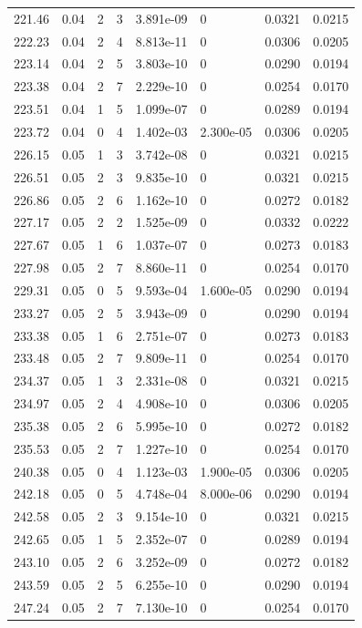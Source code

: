 \documentclass[preview]{standalone}
\begin{document}
{{{{{{\begin{tabular}{L{1.2cm}C{1.2cm} C{0.3cm}C{0.5cm} C{1.4cm}C{1.4cm} C{1.4cm}C{1.4cm}}
  221.46  &  0.04  & 2     &  3 &  3.891e-09  & 0  & 0.0321 &  0.0215   \\ 
  222.23  &  0.04  & 2     &  4 &  8.813e-11  & 0  & 0.0306 &  0.0205   \\ 
  223.14  &  0.04  & 2     &  5 &  3.803e-10  & 0  & 0.0290 &  0.0194   \\ 
  223.38  &  0.04  & 2     &  7 &  2.229e-10  & 0  & 0.0254 &  0.0170   \\ 
  223.51  &  0.04  & 1     &  5 &  1.099e-07  & 0  & 0.0289 &  0.0194   \\ 
  223.72  &  0.04  & 0     &  4 &  1.402e-03  & 2.300e-05  & 0.0306 &  0.0205   \\ 
  226.15  &  0.05  & 1     &  3 &  3.742e-08  & 0  & 0.0321 &  0.0215   \\ 
  226.51  &  0.05  & 2     &  3 &  9.835e-10  & 0  & 0.0321 &  0.0215   \\ 
  226.86  &  0.05  & 2     &  6 &  1.162e-10  & 0  & 0.0272 &  0.0182   \\ 
  227.17  &  0.05  & 2     &  2 &  1.525e-09  & 0  & 0.0332 &  0.0222   \\ 
  227.67  &  0.05  & 1     &  6 &  1.037e-07  & 0  & 0.0273 &  0.0183   \\ 
  227.98  &  0.05  & 2     &  7 &  8.860e-11  & 0  & 0.0254 &  0.0170   \\ 
  229.31  &  0.05  & 0     &  5 &  9.593e-04  & 1.600e-05  & 0.0290 &  0.0194   \\ 
  233.27  &  0.05  & 2     &  5 &  3.943e-09  & 0  & 0.0290 &  0.0194   \\ 
  233.38  &  0.05  & 1     &  6 &  2.751e-07  & 0  & 0.0273 &  0.0183   \\ 
  233.48  &  0.05  & 2     &  7 &  9.809e-11  & 0  & 0.0254 &  0.0170   \\ 
  234.37  &  0.05  & 1     &  3 &  2.331e-08  & 0  & 0.0321 &  0.0215   \\ 
  234.97  &  0.05  & 2     &  4 &  4.908e-10  & 0  & 0.0306 &  0.0205   \\ 
  235.38  &  0.05  & 2     &  6 &  5.995e-10  & 0  & 0.0272 &  0.0182   \\ 
  235.53  &  0.05  & 2     &  7 &  1.227e-10  & 0  & 0.0254 &  0.0170   \\ 
  240.38  &  0.05  & 0     &  4 &  1.123e-03  & 1.900e-05  & 0.0306 &  0.0205   \\ 
  242.18  &  0.05  & 0     &  5 &  4.748e-04  & 8.000e-06  & 0.0290 &  0.0194   \\ 
  242.58  &  0.05  & 2     &  3 &  9.154e-10  & 0  & 0.0321 &  0.0215   \\ 
  242.65  &  0.05  & 1     &  5 &  2.352e-07  & 0  & 0.0289 &  0.0194   \\ 
  243.10  &  0.05  & 2     &  6 &  3.252e-09  & 0  & 0.0272 &  0.0182   \\ 
  243.59  &  0.05  & 2     &  5 &  6.255e-10  & 0  & 0.0290 &  0.0194   \\ 
  247.24  &  0.05  & 2     &  7 &  7.130e-10  & 0  & 0.0254 &  0.0170   \\ 
\hline 
\end{tabular} 

}}}}}}
\end{document}
